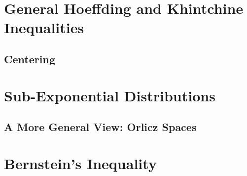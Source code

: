 \documentclass{report}
\theoremstyle{definition}
\newenvironment{exercise}[1]{
  \renewcommand\theexerciseimpl{#1}
  \exerciseimpl
}{\endexerciseimpl}
\begin{document}
\section{General Hoeffding and Khintchine Inequalities}

\begin{exercise}{2.6.4}
\end{exercise}

\begin{exercise}{2.6.5}
\end{exercise}

\begin{exercise}{2.6.6}
\end{exercise}

\begin{exercise}{2.6.7}
\end{exercise}

\subsection{Centering}

\begin{exercise}{2.6.9}
\end{exercise}

\section{Sub-Exponential Distributions}

\begin{exercise}{2.7.2}
\end{exercise}

\begin{exercise}{2.7.3}
\end{exercise}

\begin{exercise}{2.7.4}
\end{exercise}

\begin{exercise}{2.7.10}
\end{exercise}

\subsection{A More General View: Orlicz Spaces}

\begin{exercise}{2.7.11}
\end{exercise}

\section{Bernstein's Inequality}
\end{document}
